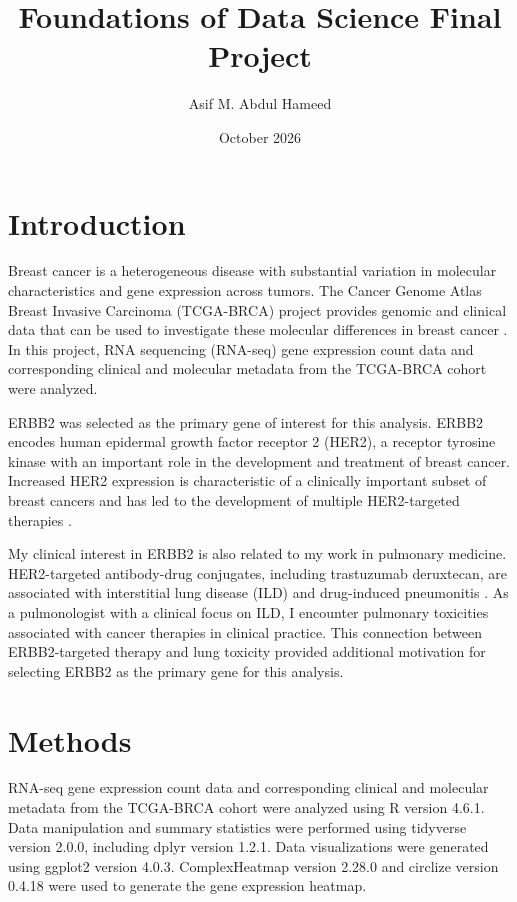 \documentclass{article}
\title{Foundations of Data Science Final Project}
\author{Asif M. Abdul Hameed}
\date{October 2026}
\begin{document}
\maketitle

\section{Introduction}

Breast cancer is a heterogeneous disease with substantial variation in
molecular characteristics and gene expression across tumors. The Cancer
Genome Atlas Breast Invasive Carcinoma (TCGA-BRCA) project provides
genomic and clinical data that can be used to investigate these molecular
differences in breast cancer \cite{TCGA2012}. In this project, RNA
sequencing (RNA-seq) gene expression count data and corresponding
clinical and molecular metadata from the TCGA-BRCA cohort were analyzed.

ERBB2 was selected as the primary gene of interest for this analysis.
ERBB2 encodes human epidermal growth factor receptor 2 (HER2), a receptor
tyrosine kinase with an important role in the development and treatment
of breast cancer. Increased HER2 expression is characteristic of a
clinically important subset of breast cancers and has led to the
development of multiple HER2-targeted therapies \cite{Gutierrez2011}.

My clinical interest in ERBB2 is also related to my work in pulmonary
medicine. HER2-targeted antibody-drug conjugates, including trastuzumab
deruxtecan, are associated with interstitial lung disease (ILD) and
drug-induced pneumonitis \cite{Tarantino2021}. As a pulmonologist with
a clinical focus on ILD, I encounter pulmonary toxicities associated
with cancer therapies in clinical practice. This connection between
ERBB2-targeted therapy and lung toxicity provided additional motivation
for selecting ERBB2 as the primary gene for this analysis.

\section{Methods}

RNA-seq gene expression count data and corresponding clinical and
molecular metadata from the TCGA-BRCA cohort were analyzed
\cite{GDCBRCA} using R version 4.6.1. Data manipulation and summary statistics were performed using tidyverse version 2.0.0, including dplyr version
1.2.1. Data visualizations were generated using ggplot2 version
4.0.3. ComplexHeatmap version 2.28.0 and circlize version 0.4.18
were used to generate the gene expression heatmap.
\end{document}

